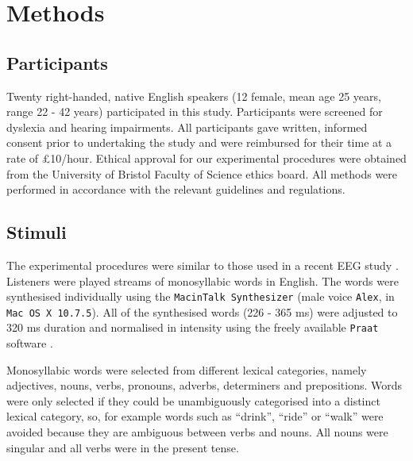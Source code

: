 \documentclass[10pt,letterpaper]{article}
\newcommand{\citet}[1]{\cite{#1}}
\begin{document}
\section*{Methods}
\subsection*{Participants}

Twenty right-handed, native English speakers (12 female, mean age 25 years, range 22 - 42 years) participated in this study. Participants were screened for dyslexia and hearing impairments. All participants gave written, informed consent prior to undertaking the study and were reimbursed for their time at a rate of £10/hour. Ethical approval for our experimental procedures were obtained from the University of Bristol Faculty of Science ethics board. All methods were performed in accordance with the relevant guidelines and regulations.

\subsection*{Stimuli}

The experimental procedures were similar to those used in a recent EEG study \cite{DingEtAl2017}. Listeners were played streams of monosyllabic words in English. The words were synthesised individually using the \texttt{MacinTalk Synthesizer} (male voice \texttt{Alex}, in \texttt{Mac OS X 10.7.5}). All of the synthesised words (226 - 365 ms) were adjusted to 320 ms duration and normalised in intensity using the freely available \texttt{Praat} software \citet{Praat}.

Monosyllabic words were selected from different lexical categories, namely adjectives, nouns, verbs, pronouns, adverbs, determiners and prepositions. Words were only selected if they could be unambiguously categorised into a distinct lexical category, so, for example words such as ``drink'', ``ride'' or ``walk'' were avoided because they are ambiguous between verbs and nouns. All nouns were singular and all verbs were in the present tense.
\end{document}
